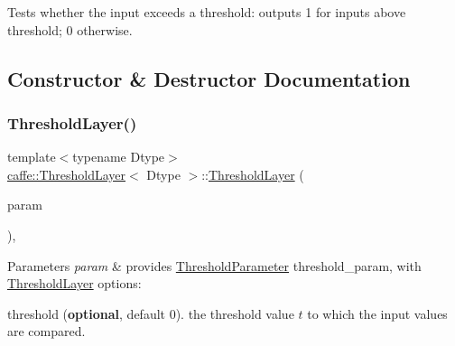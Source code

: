 Tests whether the input exceeds a threshold\+: outputs 1 for inputs above threshold; 0 otherwise. 

\subsection{Constructor \& Destructor Documentation}
\mbox{\label{classcaffe_1_1_threshold_layer_a18883bf3cb9c29828acd59b8216ba1de}} 
\subsubsection{\texorpdfstring{Threshold\+Layer()}{ThresholdLayer()}\hspace{0.1cm}{\footnotesize\ttfamily [1/2]}}
{\footnotesize\ttfamily template$<$typename Dtype$>$ \\
\mbox{\hyperlink{classcaffe_1_1_threshold_layer}{caffe\+::\+Threshold\+Layer}}$<$ Dtype $>$\+::\mbox{\hyperlink{classcaffe_1_1_threshold_layer}{Threshold\+Layer}} (\begin{DoxyParamCaption}\item[{const \mbox{\hyperlink{classcaffe_1_1_layer_parameter}{Layer\+Parameter}} \&}]{param }\end{DoxyParamCaption})\hspace{0.3cm}{\ttfamily [inline]}, {\ttfamily [explicit]}}


\begin{DoxyParams}{Parameters}
{\em param} & provides \mbox{\hyperlink{classcaffe_1_1_threshold_parameter}{Threshold\+Parameter}} threshold\+\_\+param, with \mbox{\hyperlink{classcaffe_1_1_threshold_layer}{Threshold\+Layer}} options\+:
\begin{DoxyItemize}
\item threshold ({\bfseries optional}, default 0). the threshold value $ t $ to which the input values are compared. 
\end{DoxyItemize}\\
\hline
\end{DoxyParams}
\mbox{\label{classcaffe_1_1_threshold_layer_a18883bf3cb9c29828acd59b8216ba1de}} 
